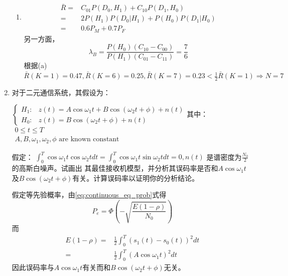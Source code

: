 \documentclass{article}
\begin{document}
\begin{enumerate}
\begin{solution}
\begin{enumerate}[label=(\alph*)]
\item 
\begin{align*}
\bar{R} = & C_{01} P(D_0,H_1) + C_{10} P(D_1,H_0) \\
         = & 2 P(H_1) P(D_0 | H_1) + P(H_0) P(D_1 | H_0) \\
         = & 0.6 P_M + 0.7 P_F
\end{align*}
另一方面，
$$
\lambda_B = \frac{P(H_0)(C_{10}-C_{00})}{P(H_1)(C_{01}-C_{11})} = \frac{7}{6}
$$
根据(a)
$\bar{R}(K=1)=0.47,\bar{R}(K=6)=0.25,\bar{R}(K=7)=0.23 < \frac{1}{2}\bar{R}(K=1) \Rightarrow N=7$
\end{enumerate}
\end{solution}
\item 对于二元通信系统，其假设为：

$
\begin{cases}
H_1 : & z(t) = A\cos\omega_1 t + B \cos(\omega_2 t +\phi) + n(t)\\
H_0 : & z(t) = B\cos(\omega_2 t + \phi) + n(t)
\end{cases}
$其中：$\begin{array}{c}
0\leq t \leq T \\
A,B,\omega_1,\omega_2,\phi \textrm{ are known constant}
\end{array}$

假定： $\int_0^T \cos\omega_1 t \cos\omega_2 t dt = \int_0^T \cos\omega_1 t \sin\omega_2 t dt = 0, n(t)$ 是谱密度为$\frac{N_0}{2}$的高斯白噪声。试画出
其最佳接收机模型，并分析其误码率是否和$A\cos\omega_1 t $及$B\cos(\omega_2 t + \phi)$有关。计算误码率以证明你的分析结论。
\begin{solution}
假定等先验概率，由\eqref{eq:continuous_eq_prob}式得 
$$
P_e = \Phi(-\sqrt{\frac{E(1-\rho)}{N_0}})
$$
而
\begin{align*}
E(1-\rho) = & \frac{1}{2} \int_0^T (s_1(t)-s_0(t))^2 dt \\
          = &  \frac{1}{2} \int_0^T (A\cos\omega_1 t)^2 dt 
\end{align*}
因此误码率与$A\cos\omega_1 t$有关而和$B\cos(\omega_2 t + \phi)$无关。
\end{solution}
\end{enumerate}
\end{document}
